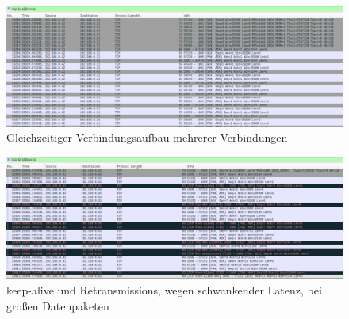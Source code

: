 \begin{figure}[h]
	\centering
	\includegraphics[width=1\textwidth]{Graphics/MTCon.png}
	\caption{Gleichzeitiger Verbindungsaufbau mehrerer Verbindungen}
\end{figure}

\begin{figure}[h]
	\centering
	\includegraphics[width=1\textwidth]{Graphics/latency.png}
	\caption{keep-alive und Retransmissions, wegen schwankender Latenz, bei großen Datenpaketen}
\end{figure}